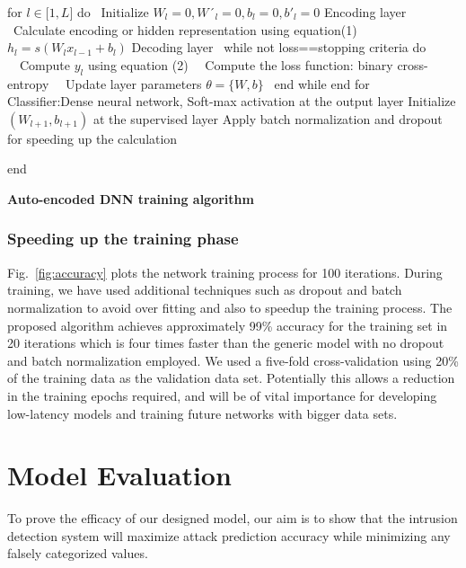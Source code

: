 \documentclass[letterpaper, 10pt, conference]{ieeeconf} %
\newcommand{\fig}[1]{Fig.~\ref{#1}}
\begin{document}
\begin{algorithm}[h]\label{algorithm}
\small 
{}

\nl for $l \in\mathcal [1, L]$ do\;
\nl \ Initialize $ W_l = 0, W´_l = 0, b_l = 0, b'_{l} = 0$\;
 {Encoding layer}\;
\nl \ Calculate encoding or hidden representation using equation(1)\;
\ \  \ \ \  $ h_{l} = s(W_{l}x_{l−1} + b_{l})$\;
{Decoding layer}\;
\nl\ while not loss==stopping criteria do\;
\nl \ \ Compute $y_{l}$ using equation (2)\;
\nl \ \ Compute the loss function: binary cross-entropy\;
\nl\ \ Update layer parameters  $\theta = \{W, b\}$\;
\nl \ end while\;
\nl end for\;
{Classifier:Dense neural network, Soft-max activation at the output layer}\;
\nl Initialize $(W_{l+1}, b_{l+1})$ at the supervised layer\;
\;
\nl Apply batch normalization and dropout for speeding up the calculation\;

\nl  end\;
    {\caption{\bf Auto-encoded DNN training algorithm} \label{Algorithm}
    }
\end{algorithm}

\subsubsection{ Speeding up the training phase}
\fig{fig:accuracy} plots the network training process for 100 iterations. During training, we have used additional techniques such as dropout and batch normalization to avoid over fitting and also to speedup the training process. The proposed algorithm   achieves approximately 99\% accuracy for the training set in 20 iterations which is four times faster than the generic model with no dropout and batch normalization employed. We used a five-fold cross-validation using 20\% of the training data as the validation data set. Potentially this allows a reduction in the training epochs required, and will be of vital importance for developing low-latency models and training future networks with bigger data sets.

\section{Model Evaluation} \label{sec:evaluation}
To prove the efficacy of our designed model, our aim is to show that the intrusion detection system will maximize attack prediction accuracy  while minimizing any falsely categorized values.
\end{document}
